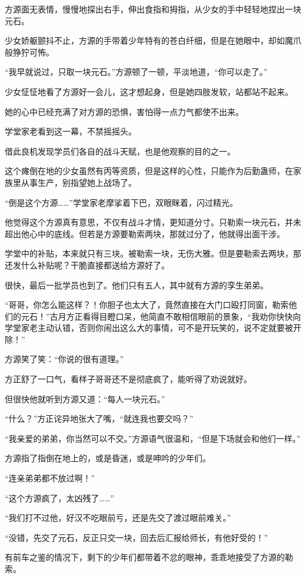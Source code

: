 \begin{this_body}
方源面无表情，慢慢地探出右手，伸出食指和拇指，从少女的手中轻轻地捏出一块元石。

少女娇躯颤抖不止，方源的手带着少年特有的苍白纤细，但是在她眼中，却如魔爪般狰狞可怖。

“我早就说过，只取一块元石。”方源顿了一顿，平淡地道，“你可以走了。”

少女怔怔地看了方源好一会儿，这才想起身，但是她四肢发软，站都站不起来。

她的心中已经充满了对方源的恐惧，害怕得一点力气都使不出来。

学堂家老看到这一幕，不禁摇摇头。

借此良机发现学员们各自的战斗天赋，也是他观察的目的之一。

这个瘫倒在地的少女虽然有丙等资质，但是这样的心性，只能作为后勤蛊师，在家族里从事生产，别指望她上战场了。

“倒是这个方源……”学堂家老摩挲着下巴，双眼眯着，闪过精光。

他觉得这个方源真有意思，不仅有战斗才情，更知道分寸。只勒索一块元石，并未超出他心中的底线。但若是方源要勒索两块，那就过分了，他就得出面干涉。

学堂中的补贴，本来就只有三块。被勒索一块，无伤大雅。但是要勒索去两块，那还发什么补贴呢？干脆直接都送给方源好了。

很快，最后一批学员也到了。他们只有五人，其中就有方源的孪生弟弟。

“哥哥，你怎么能这样？！你胆子也太大了，竟然直接在大门口殴打同窗，勒索他们的元石！”古月方正看得目瞪口呆，他简直不敢相信眼前的景象，“我劝你快快向学堂家老主动认错，否则你闹出这么大的事情，可不是开玩笑的，说不定就要被开除！”

方源笑了笑：“你说的很有道理。”

方正舒了一口气，看样子哥哥还不是彻底疯了，能听得了劝说就好。

但很快他就听到方源又道：“每人一块元石。”

“什么？”方正诧异地张大了嘴，“就连我也要交吗？”

“我亲爱的弟弟，你当然可以不交。”方源语气很温和，“但是下场就会和他们一样。”

方源指了指倒在地上的，或是昏迷，或是呻吟的少年们。

“连亲弟弟都不放过啊！”

“这个方源疯了，太凶残了……”

“我们打不过他，好汉不吃眼前亏，还是先交了渡过眼前难关。”

“没错，先交了元石，反正只交一块，回去后汇报给师长，有他好受的！”

有前车之鉴的情况下，剩下的少年们都带着不忿的眼神，乖乖地接受了方源的勒索。


\end{this_body}
